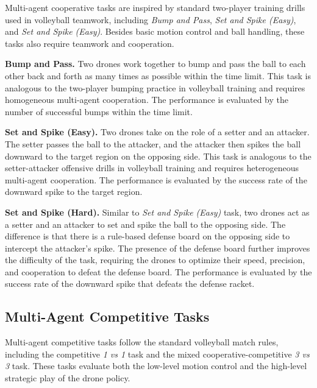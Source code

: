 Multi-agent cooperative tasks are inspired by standard two-player training drills used in volleyball teamwork, including \textit{Bump and Pass}, \textit{Set and Spike (Easy)}, and \textit{Set and Spike (Easy)}. Besides basic motion control and ball handling, these tasks also require teamwork and cooperation.

\textbf{Bump and Pass.}
Two drones work together to bump and pass the ball to each other back and forth as many times as possible within the time limit. This task is analogous to the two-player bumping practice in volleyball training and requires homogeneous multi-agent cooperation. The performance is evaluated by the number of successful bumps within the time limit.

\textbf{Set and Spike (Easy).}
Two drones take on the role of a setter and an attacker. The setter passes the ball to the attacker, and the attacker then spikes the ball downward to the target region on the opposing side. This task is analogous to the setter-attacker offensive drills in volleyball training and requires heterogeneous multi-agent cooperation. The performance is evaluated by the success rate of the downward spike to the target region.

\textbf{Set and Spike (Hard).}
Similar to \textit{Set and Spike (Easy)} task, two drones act as a setter and an attacker to set and spike the ball to the opposing side. The difference is that there is a rule-based defense board on the opposing side to intercept the attacker's spike. The presence of the defense board further improves the difficulty of the task, requiring the drones to optimize their speed, precision, and cooperation to defeat the defense board. The performance is evaluated by the success rate of the downward spike that defeats the defense racket.

\subsection{Multi-Agent Competitive Tasks}

Multi-agent competitive tasks follow the standard volleyball match rules, including the competitive \textit{1 vs 1} task and the mixed cooperative-competitive \textit{3 vs 3} task. These tasks evaluate both the low-level motion control and the high-level strategic play of the drone policy. 

